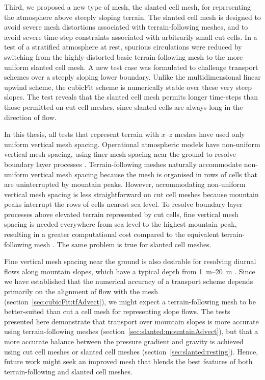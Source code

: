 Third, we proposed a new type of mesh, the slanted cell mesh, for representing the atmosphere above steeply sloping terrain.
The slanted cell mesh is designed to avoid severe mesh distortions associated with terrain-following meshes, and to avoid severe time-step constraints associated with arbitrarily small cut cells.
In a test of a stratified atmosphere at rest, spurious circulations were reduced by switching from the highly-distorted basic terrain-following mesh to the more uniform slanted cell mesh.
A new test case was formulated to challenge transport schemes over a steeply sloping lower boundary.
Unlike the multidimensional linear upwind scheme, the cubicFit scheme is numerically stable over these very steep slopes.
The test reveals that the slanted cell mesh permits longer time-steps than those permitted on cut cell meshes, since slanted cells are always long in the direction of flow.

In this thesis, all tests that represent terrain with $x$--$z$ meshes have used only uniform vertical mesh spacing.
Operational atmospheric models have non-uniform vertical mesh spacing, using finer mesh spacing near the ground to resolve boundary layer processes \citep[p. 547]{chow2013}.
Terrain-following meshes naturally accommodate non-uniform vertical mesh spacing because the mesh is organised in rows of cells that are uninterrupted by mountain peaks.
However, accommodating non-uniform vertical mesh spacing is less straightforward on cut cell meshes because mountain peaks interrupt the rows of cells nearest sea level.
To resolve boundary layer processes above elevated terrain represented by cut cells, fine vertical mesh spacing is needed everywhere from sea level to the highest mountain peak, resulting in a greater computational cost compared to the equivalent terrain-following mesh \citep{walko-avissar2008b}.
The same problem is true for slanted cell meshes.

Fine vertical mesh spacing near the ground is also desirable for resolving diurnal flows along mountain slopes, which have a typical depth from \SIrange{1}{20}{\meter} \citep[p. 39]{chow2013}.
Since we have established that the numerical accuracy of a transport scheme depends primarily on the alignment of flow with the mesh (section~\ref{sec:cubicFit:tfAdvect}), we might expect a terrain-following mesh to be better-suited than cut a cell mesh for representing slope flows.
The tests presented here demonstrate that transport over mountain slopes is more accurate using terrain-following meshes (section~\ref{sec:slanted:mountainAdvect}), but that a more accurate balance between the pressure gradient and gravity is achieved using cut cell meshes or slanted cell meshes (section~\ref{sec:slanted:resting}).
Hence, future work might seek an improved mesh that blends the best features of both terrain-following and slanted cell meshes.

